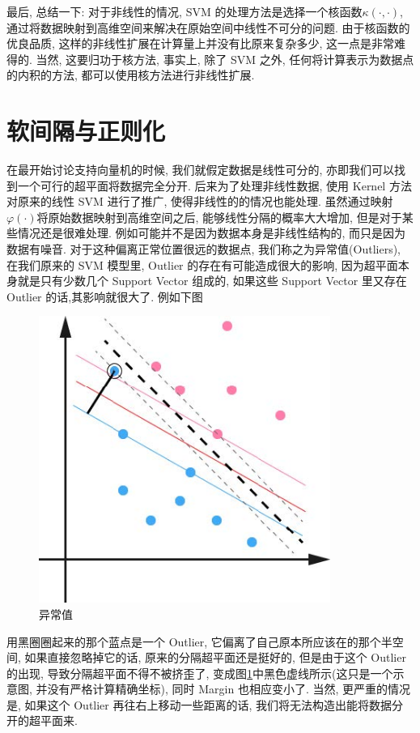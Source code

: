 \documentclass[a4paper,UTF8]{ctexart}
\theoremstyle{plain} \newtheorem{theorem}{定理}[section]
\theoremstyle{plain} \newtheorem{definition}{定义}[section]
\theoremstyle{plain} \newtheorem{lemma}{引理}[section]
\theoremstyle{plain} \newtheorem{proposition}{命题}[section]
\theoremstyle{plain} \newtheorem{example}{例}
\theoremstyle{plain} \newtheorem{remark}{注}
\theoremstyle{plain} \newtheorem{corollary}{推论}[section]
\begin{document}
最后, 总结一下: 对于非线性的情况, SVM 的处理方法是选择一个核函数$\kappa(\cdot,\cdot)$, 通过将数据映射到高维空间来解决在原始空间中线性不可分的问题. 由于核函数的优良品质, 这样的非线性扩展在计算量上并没有比原来复杂多少, 这一点是非常难得的. 当然, 这要归功于核方法, 事实上, 除了 SVM 之外, 任何将计算表示为数据点的内积的方法, 都可以使用核方法进行非线性扩展.


\section{软间隔与正则化}
在最开始讨论支持向量机的时候, 我们就假定数据是线性可分的, 亦即我们可以找到一个可行的超平面将数据完全分开. 后来为了处理非线性数据, 使用 Kernel 方法对原来的线性 SVM 进行了推广, 使得非线性的的情况也能处理. 虽然通过映射$\varphi(\cdot)$将原始数据映射到高维空间之后, 能够线性分隔的概率大大增加, 但是对于某些情况还是很难处理. 例如可能并不是因为数据本身是非线性结构的, 而只是因为数据有噪音. 对于这种偏离正常位置很远的数据点, 我们称之为异常值(Outliers), 在我们原来的 SVM 模型里, Outlier 的存在有可能造成很大的影响, 因为超平面本身就是只有少数几个 Support Vector 组成的, 如果这些 Support Vector 里又存在 Outlier 的话,其影响就很大了. 例如下图
\begin{figure}[!htb]
	\centering
	\includegraphics[width=0.85\textwidth]{outlier.jpg}
	\caption{异常值}
	\label{outlier}
\end{figure}

用黑圈圈起来的那个蓝点是一个 Outlier, 它偏离了自己原本所应该在的那个半空间, 如果直接忽略掉它的话, 原来的分隔超平面还是挺好的, 但是由于这个 Outlier 的出现, 导致分隔超平面不得不被挤歪了, 变成图\ref{outlier}中黑色虚线所示(这只是一个示意图, 并没有严格计算精确坐标), 同时 Margin 也相应变小了. 当然, 更严重的情况是, 如果这个 Outlier 再往右上移动一些距离的话, 我们将无法构造出能将数据分开的超平面来.
\end{document}
